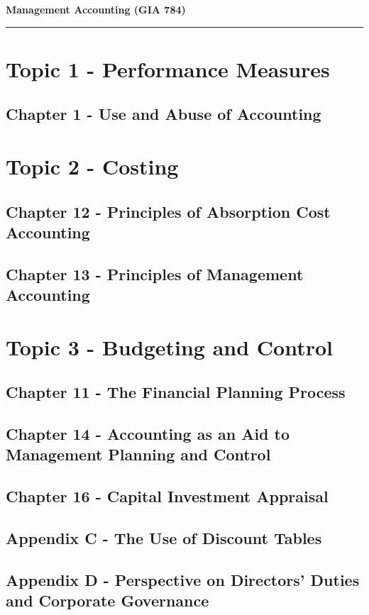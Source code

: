 \documentclass[11pt]{article}
\theoremstyle{definition}
\begin{document}

\setcounter{section}{0}

\thispagestyle{empty}

\begin{center}
\LARGE \bf Management Accounting (GIA 784)\
\end{center}

\noindent\rule{\textwidth}{1pt}

\section{Topic 1 - Performance Measures}
\subsection{Chapter 1 - Use and Abuse of Accounting}

\newpage
\section{Topic 2 - Costing}
\subsection{Chapter 12 - Principles of Absorption Cost Accounting}

\subsection{Chapter 13 - Principles of Management Accounting}

\newpage
\section{Topic 3 - Budgeting and Control}
\subsection{Chapter 11 - The Financial Planning Process}

\subsection{Chapter 14 - Accounting as an Aid to Management Planning and Control}

\subsection{Chapter 16 - Capital Investment Appraisal}

\subsection{Appendix C - The Use of Discount Tables}

\subsection{Appendix D - Perspective on Directors' Duties and Corporate Governance}

\end{document}
